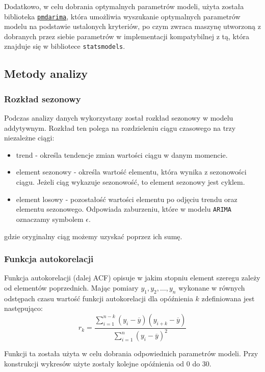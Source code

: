 \documentclass[12pt]{article}
\begin{document}
Dodatkowo, w celu dobrania optymalnych parametrów modeli, użyta została biblioteka \href{https://alkaline-ml.com/pmdarima/}{\texttt{pmdarima}}, która umożliwia wyszukanie optymalnych parametrów modelu na podstawie ustalonych kryteriów, po czym zwraca maszynę utworzoną z dobranych przez siebie parametrów w implementacji kompatybilnej z tą, która znajduje się w bibliotece \texttt{statsmodels}.

\subsection{Metody analizy}

\subsubsection{Rozkład sezonowy}

Podczas analizy danych wykorzystany został rozkład sezonowy w modelu addytywnym. Rozkład ten polega na rozdzieleniu ciągu czasowego na trzy niezależne ciągi:
\begin{itemize}
    \item trend - określa tendencje zmian wartości ciągu w danym momencie.
    \item element sezonowy - określa wartość elementu, która wynika z sezonowości ciągu. Jeżeli ciąg wykazuje sezonowość, to element sezonowy jest cyklem.
    \item element losowy - pozostałość wartości elementu po odjęciu trendu oraz elementu sezonowego. Odpowiada zaburzeniu, które w modelu \texttt{ARIMA} oznaczamy symbolem $\epsilon$.
\end{itemize}
gdzie oryginalny ciąg możemy uzyskać poprzez ich sumę.

\subsubsection{Funkcja autokorelacji}

Funkcja autokorelacji (dalej ACF) opisuje w jakim stopniu element szeregu zależy od elementów poprzednich. Mając pomiary $y_1, y_2, \dots, y_n$ wykonane w równych odstępach czasu wartość funkcji autokorelacji dla opóźnienia $k$ zdefiniowana jest następująco:
\[
    r_k = \frac{\sum^{n-k}_{i=1}(y_i - \overline{y})(y_{i+k} - \overline{y})}
    {\sum^{n}_{i=1}(y_i - \overline{y})^2}
\]

Funkcji ta została użyta w celu dobrania odpowiednich parametrów modeli. Przy konstrukcji wykresów użyte zostały kolejne opóźnienia od $0$ do $30$.
\end{document}
